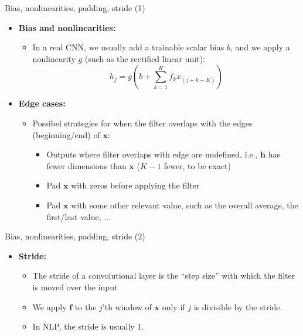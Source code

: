 
\begin{vbframe}{Bias, nonlinearities, padding, stride (1)}

\vfill

\begin{itemize}
	\item \textbf{Bias and nonlinearities:}
		\begin{itemize}
			\item In a real CNN, we usually add a trainable scalar bias $b$, and we apply a nonlinearity $g$ (such as the rectified linear unit):
			$$h_j = g(b + \sum_{k=1}^K f_k x_{(j+k-K)}) $$
		\end{itemize}
	\item \textbf{Edge cases:}
		\begin{itemize}
			\item Possibel strategies for when the filter overlaps with the edges (beginning/end) of $\mathbf{x}$:
				\begin{itemize}
					\item Outputs where filter overlaps with edge are undefined, i.e., $\mathbf{h}$ has fewer dimensions than $\mathbf{x}$ ($K-1$ fewer, to be exact)
					\item Pad $\mathbf{x}$ with zeros before applying the filter
					\item Pad $\mathbf{x}$ with some other relevant value, such as the overall average, the first/last value, ...
				\end{itemize}
		\end{itemize}
\end{itemize}

\vfill

\end{vbframe}


\begin{vbframe}{Bias, nonlinearities, padding, stride (2)}

\vfill

\begin{itemize}
	\item \textbf{Stride:}
		\begin{itemize}
			\item The stride of a convolutional layer is the ``step size'' with which the filter is moved over the input
			\item We apply $\mathbf{f}$ to the $j$'th window of $\mathbf{x}$ only if $j$ is divisible by the stride.
			\item In NLP, the stride is usually $1$.
		\end{itemize}
\end{itemize}

\vfill

\end{vbframe}


